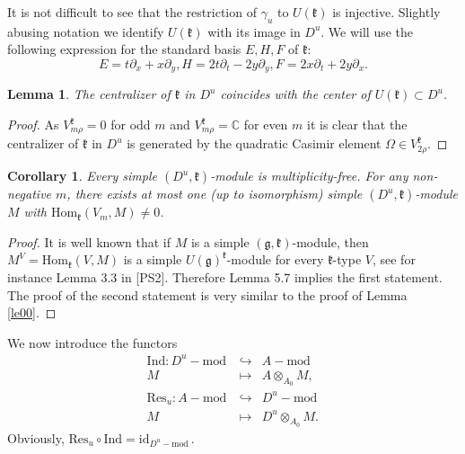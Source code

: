 \documentclass[12pt]{amsart}
\theoremstyle{plain} %
\newtheorem{lemma}[definition]{Lemma}
\newtheorem{corollary}[definition]{Corollary}
\renewcommand{\hom}{\mathrm{Hom}}
\newcommand{\Hom}{\mathrm{Hom}}
\newcommand{\res}{\mathrm{Res}}
\newcommand{\Ind}{\mathrm{Ind}}
\newcommand{\id}{\mathrm{id}}
\newcommand {\CC} {\mathbb {C}}
\newcommand{\kk}{\mathfrak{k}}
\renewcommand{\gg}{\mathfrak{g}}
\renewcommand{\mod}{\mathrm{mod~}}
\newcommand{\refle}[1]{Lemma \ref{#1}}
\begin{document}
It is not difficult to see that the restriction of $\gamma_u$ to $U(\kk)$ is injective. Slightly abusing notation we identify $U(\kk)$ with its image in $D^u$. We will use the following expression for the standard basis $E,H,F$ of $\kk$:
\begin{equation}\label{princ}
E=t\partial_x+x\partial_y, H=2t\partial_t-2y\partial_y, F=2x\partial_t+2y\partial_x.
\end{equation}

\begin{lemma}\label {le102sl} The centralizer of $\kk$ in $D^u$ coincides with the center of $U(\kk)\subset D^u$.
\end{lemma}
\begin{proof}
As $V_{m\rho}^{\kk}=0$ for odd $m$ and  $V_{m\rho}^{\kk}=\CC$ for even
$m$ it is clear that the centralizer of $\kk$ in $D^u$ is generated by
the quadratic Casimir element $\Omega \in V_{2\rho}^{\kk}$.
\end{proof}

\begin{corollary}\label{cor98}
Every simple $(D^u,\kk)$-module is multiplicity-free. For any non-negative
 $m$, there exists at most one (up to isomorphism) 
simple $(D^u,\kk)$-module $M$ with $\hom_{\kk}(V_m,M)\neq 0$.
\end{corollary}
\begin{proof} It is well known that if $M$ is a simple $(\gg, \kk)$-module, then $M^{V}=\Hom_\kk(V, M)$ is a simple $U(\gg)^{\kk}$-module for every $\kk$-type $V$, see for instance Lemma 3.3 in [PS2]. Therefore Lemma 5.7 implies the first statement. The proof of the second statement is very similar to the proof of \refle{le00}.
\end{proof}

We now introduce the functors
\begin{eqnarray*}
\Ind: D^u-\mod &\hookrightarrow &A-\mod \\
M&\mapsto&A\otimes_{A_0}M,\\
\res_u:A-\mod&\hookrightarrow & D^u-\mod\\
M&\mapsto& D^u\otimes_{A_0}M.
\end{eqnarray*}
Obviously, $\res_u\circ\Ind=\id_{D^u-\mod}$.
\end{document}
